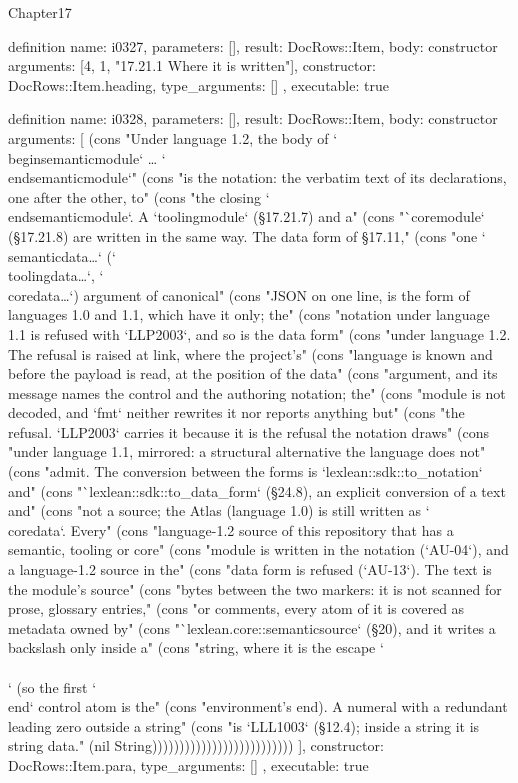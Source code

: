 \begin{lexlean}{Chapter17}
\begin{semanticmodule}
definition{
  name: i0327,
  parameters: [],
  result: DocRows::Item,
  body: constructor{
    arguments: [4, 1, "17.21.1 Where it is written"],
    constructor: DocRows::Item.heading,
    type_arguments: []
  },
  executable: true
}

definition{
  name: i0328,
  parameters: [],
  result: DocRows::Item,
  body: constructor{
    arguments: [
      (cons "Under language 1.2, the body of `\\begin{semanticmodule}` … `\\end{semanticmodule}`" (cons "is the notation: the verbatim text of its declarations, one after the other, to" (cons "the closing `\\end{semanticmodule}`. A `toolingmodule` (§17.21.7) and a" (cons "`coremodule` (§17.21.8) are written in the same way. The data form of §17.11," (cons "one `\\semanticdata{…}` (`\\toolingdata{…}`, `\\coredata{…}`) argument of canonical" (cons "JSON on one line, is the form of languages 1.0 and 1.1, which have it only; the" (cons "notation under language 1.1 is refused with `LLP2003`, and so is the data form" (cons "under language 1.2. The refusal is raised at link, where the project's" (cons "language is known and before the payload is read, at the position of the data" (cons "argument, and its message names the control and the authoring notation; the" (cons "module is not decoded, and `fmt` neither rewrites it nor reports anything but" (cons "the refusal. `LLP2003` carries it because it is the refusal the notation draws" (cons "under language 1.1, mirrored: a structural alternative the language does not" (cons "admit. The conversion between the forms is `lexlean::sdk::to_notation` and" (cons "`lexlean::sdk::to_data_form` (§24.8), an explicit conversion of a text and" (cons "not a source; the Atlas (language 1.0) is still written as `\\coredata`. Every" (cons "language-1.2 source of this repository that has a semantic, tooling or core" (cons "module is written in the notation (`AU-04`), and a language-1.2 source in the" (cons "data form is refused (`AU-13`). The text is the module's source" (cons "bytes between the two markers: it is not scanned for prose, glossary entries," (cons "or comments, every atom of it is covered as metadata owned by" (cons "`lexlean.core::semanticsource` (§20), and it writes a backslash only inside a" (cons "string, where it is the escape `\\\\` (so the first `\\end` control atom is the" (cons "environment's end). A numeral with a redundant leading zero outside a string" (cons "is `LLL1003` (§12.4); inside a string it is string data." (nil String))))))))))))))))))))))))))
    ],
    constructor: DocRows::Item.para,
    type_arguments: []
  },
  executable: true
}


\end{semanticmodule}
\end{lexlean}
